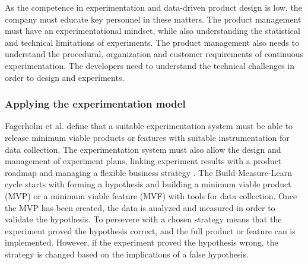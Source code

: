 \documentclass[english]{tktltiki2}
\theoremstyle{definition}
\theoremstyle{remark}
\begin{document}
As the competence in experimentation and data-driven product design is low, the company must educate key personnel in these matters. The product management must have an experimentational mindset, while also understanding the statistical and technical limitations of experiments. The product management also needs to understand the procedural, organization and customer requirements of continuous experimentation. The developers need to understand the technical challenges in order to design and experiments.






\subsubsection{Applying the experimentation model}
Fagerholm et al. define that a suitable experimentation system must be able to release minimum viable products or features with suitable instrumentation for data collection. The experimentation system must also allow the design and management of experiment plans, linking experiment results with a product roadmap and managing a flexible business strategy \cite{fagerholm2014building}. The Build-Measure-Learn cycle starts with forming a hypothesis and building a minimum viable product (MVP) or a minimum viable feature (MVF) with tools for data collection. Once the MVP has been created, the data is analyzed and measured in order to validate the hypothesis. To persevere with a chosen strategy means that the experiment proved the hypothesis correct, and the full product or feature can is implemented. However, if the experiment proved the hypothesis wrong, the strategy is changed based on the implications of a false hypothesis.
\end{document}
